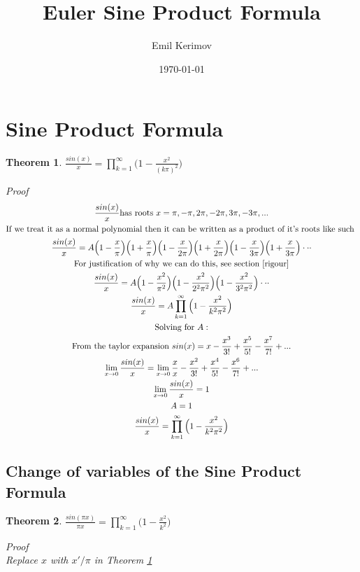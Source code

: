 \documentclass[a4paper]{article}
\title{Euler Sine Product Formula}
\author{Emil Kerimov}
\date{\today}
\begin{document}
\maketitle

\newtheorem{theorem}{Theorem}[section]
\newtheorem{corollary}{Corollary}[theorem]
\newtheorem{lemma}[theorem]{Lemma}
\newtheorem{definition}{Definition}[section]

\section{Sine Product Formula}

\begin{theorem} \label{sine prod formula} 
$\boxed{\frac{sin(x)}{x} = \prod_{k=1}^{\infty} \Big( 1-\frac{x^2}{(k\pi)^2} \Big)}$

Proof
\begin{gather*}
\frac{sin(x)}{x} \text{has roots } x = \pi, -\pi, 2\pi, -2\pi, 3\pi, -3\pi, ... \\
\text{If we treat it as a normal polynomial then it can be written as a product of it's roots like such }\\
\frac{sin(x)}{x} = A \Big(1-\frac{x}{\pi}\Big)\Big(1+\frac{x}{\pi}\Big)
\Big(1-\frac{x}{2\pi}\Big)
\Big(1+\frac{x}{2\pi}\Big)
\Big(1-\frac{x}{3\pi}\Big)
\Big(1+\frac{x}{3\pi}\Big) \cdot \cdot \cdot \\
\text{For justification of why we can do this, see section \ref{rigour}}\\
\frac{sin(x)}{x} = A \Big(1-\frac{x^2}{\pi^2}\Big)
\Big(1-\frac{x^2}{2^2 \pi^2}\Big)
\Big(1-\frac{x^2}{3^2 \pi^2}\Big) \cdot \cdot \cdot \\
\frac{sin(x)}{x} = A \prod_{k=1}^{\infty}
\Big(1-\frac{x^2}{k^2 \pi^2}\Big)
\\
\text{Solving for } A:
\\
\text{From the taylor expansion }
sin(x) = x - \frac{x^3}{3!} + \frac{x^5}{5!} - \frac{x^7}{7!} + ... \\
\lim_{x \to 0} \frac{sin(x)}{x} = \lim_{x \to 0} \frac{x}{x} - \frac{x^2}{3!} + \frac{x^4}{5!} - \frac{x^6}{7!} + ... \\
\lim_{x \to 0} \frac{sin(x)}{x} = 1\\
 A = 1 \\
 \frac{sin(x)}{x} = \prod_{k=1}^{\infty}
\Big(1-\frac{x^2}{k^2 \pi^2}\Big)
\end{gather*}
\end{theorem}

\subsection{Change of variables of the Sine Product Formula}
\begin{theorem} \label{sine prod formula no pi} 
$\boxed{\frac{sin(\pi x)}{\pi x} = \prod_{k=1}^{\infty} \Big( 1-\frac{x^2}{k^2} \Big)}$

Proof\\
Replace $x$ with $x'/\pi$ in Theorem \ref{sine prod formula}
\end{theorem}
\end{document}
